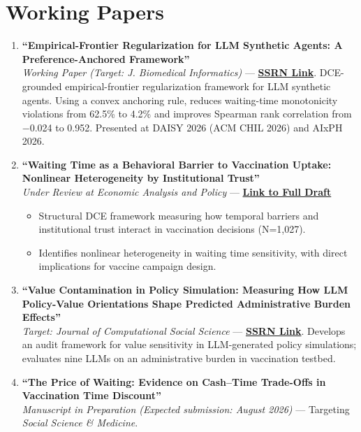 \documentclass[11pt, letterpaper]{article}
\begin{document}
\section*{Working Papers}
\begin{enumerate}
    \item \textbf{``Empirical-Frontier Regularization for LLM Synthetic Agents: A Preference-Anchored Framework''} \\
    \textit{Working Paper (Target: J. Biomedical Informatics)} --- \href{https://papers.ssrn.com/sol3/papers.cfm?abstract_id=6686418}{\textbf{SSRN Link}}. DCE-grounded empirical-frontier regularization framework for LLM synthetic agents. Using a convex anchoring rule, reduces waiting-time monotonicity violations from 62.5\% to 4.2\% and improves Spearman rank correlation from $-$0.024 to 0.952. Presented at DAISY 2026 (ACM CHIL 2026) and AIxPH 2026.

    \item \textbf{``Waiting Time as a Behavioral Barrier to Vaccination Uptake: Nonlinear Heterogeneity by Institutional Trust''} \\
    \textit{Under Review at Economic Analysis and Policy} --- \href{https://yichao2022.github.io/jmp.pdf}{\textbf{Link to Full Draft}}
    \begin{itemize}[noitemsep, topsep=0pt]
        \item Structural DCE framework measuring how temporal barriers and institutional trust interact in vaccination decisions (N=1,027).
        \item Identifies nonlinear heterogeneity in waiting time sensitivity, with direct implications for vaccine campaign design.
    \end{itemize}

    \item \textbf{``Value Contamination in Policy Simulation: Measuring How LLM Policy-Value Orientations Shape Predicted Administrative Burden Effects''} \\
    \textit{Target: Journal of Computational Social Science} --- \href{https://papers.ssrn.com/sol3/papers.cfm?abstract_id=6876161}{\textbf{SSRN Link}}. Develops an audit framework for value sensitivity in LLM-generated policy simulations; evaluates nine LLMs on an administrative burden in vaccination testbed.

    \item \textbf{``The Price of Waiting: Evidence on Cash--Time Trade-Offs in Vaccination Time Discount''} \\
    \textit{Manuscript in Preparation (Expected submission: August 2026)} --- Targeting \textit{Social Science \& Medicine}.
\end{enumerate}
\end{document}
